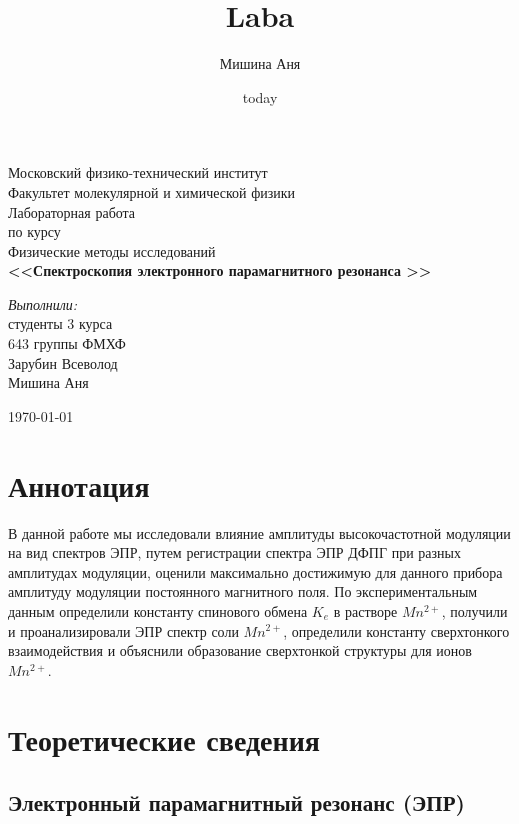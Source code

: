 \documentclass[a4paper,12pt]{article}
\title{Laba}
\author{Мишина Аня}
\date{today}
\begin{document}
\begin{titlepage}
\begin{center} 
 
\large Московский физико-технический институт\\
Факультет молекулярной и химической физики\\
\vspace{7cm}
\Large Лабораторная работа \\по курсу \\ Физические методы исследований\\
\textbf{\Huge <<Спектроскопия электронного парамагнитного резонанса >>}\\
\end{center} 

\vspace{5cm}
{\par 
	\raggedleft \large 
	\emph{Выполнили:}\\ 
	студенты 3 курса\\ 
	643 группы ФМХФ\\ 
	Зарубин Всеволод  \\ 
	Мишина Аня 
\par}
\begin{center}
\vfill \today
\end{center}
\end{titlepage}
\newpage
\setcounter{page}{2}

   
	\newpage
	\section{Аннотация}
	\par В данной работе мы исследовали влияние амплитуды высокочастотной модуляции на вид спектров ЭПР, путем регистрации спектра ЭПР ДФПГ при разных амплитудах модуляции, оценили максимально достижимую для данного прибора амплитуду модуляции постоянного магнитного поля. По экспериментальным данным определили константу спинового обмена $K_e$ в растворе $Mn^{2+}$, получили и проанализировали ЭПР спектр соли $Mn^{2+}$, определили константу сверхтонкого взаимодействия и объяснили образование сверхтонкой структуры для ионов $Mn^{2+}$.
	
	\section{Теоретические сведения}
	
	\subsection{Электронный парамагнитный резонанс (ЭПР)}
	
\end{document}
